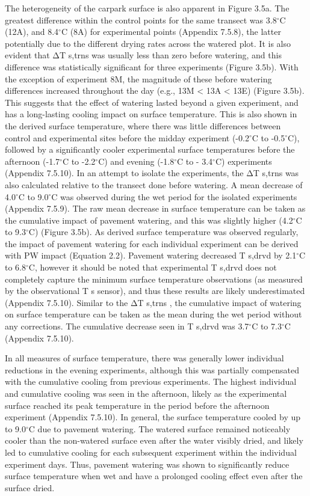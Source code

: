 \documentclass[final,3p,times,authoryear]{elsarticle}
\begin{document}
The heterogeneity of the carpark surface is also apparent in Figure 3.5a. The greatest
difference within the control points for the same transect was 3.8$^{\circ}$C (12A), and 8.4$^{\circ}$C
(8A) for experimental points (Appendix 7.5.8), the latter potentially due to the different
drying rates across the watered plot.
It is also evident that ΔT s,trns was usually less than zero before watering, and this
difference was statistically significant for three experiments (Figure 3.5b). With the
exception of experiment 8M, the magnitude of these before watering differences
increased throughout the day (e.g., 13M < 13A < 13E) (Figure 3.5b). This suggests that
the effect of watering lasted beyond a given experiment, and has a long-lasting cooling impact on surface temperature. This is also shown in the derived surface temperature,
where there was little differences between control and experimental sites before the
midday experiment (-0.2$^{\circ}$C to -0.5$^{\circ}$C), followed by a significantly cooler experimental
surface temperatures before the afternoon (-1.7$^{\circ}$C to -2.2$^{\circ}$C) and evening (-1.8$^{\circ}$C to -
3.4$^{\circ}$C) experiments (Appendix 7.5.10).
In an attempt to isolate the experiments, the ΔT s,trns was also calculated relative to the
transect done before watering. A mean decrease of 4.0$^{\circ}$C to 9.0$^{\circ}$C was observed
during the wet period for the isolated experiments (Appendix 7.5.9). The raw mean
decrease in surface temperature can be taken as the cumulative impact of pavement
watering, and this was slightly higher (4.2$^{\circ}$C to 9.3$^{\circ}$C) (Figure 3.5b).
As derived surface temperature was observed regularly, the impact of pavement
watering for each individual experiment can be derived with PW impact (Equation 2.2).
Pavement watering decreased T s,drvd by 2.1$^{\circ}$C to 6.8$^{\circ}$C, however it should be noted that
experimental T s,drvd does not completely capture the minimum surface temperature
observations (as measured by the observational T s sensor), and thus these results are
likely underestimated (Appendix 7.5.10). Similar to the ΔT s,trns , the cumulative impact
of watering on surface temperature can be taken as the mean during the wet period
without any corrections. The cumulative decrease seen in T s,drvd was 3.7$^{\circ}$C to 7.3$^{\circ}$C
(Appendix 7.5.10).

In all measures of surface temperature, there was generally lower individual reductions
in the evening experiments, although this was partially compensated with the
cumulative cooling from previous experiments. The highest individual and cumulative
cooling was seen in the afternoon, likely as the experimental surface reached its peak
temperature in the period before the afternoon experiment (Appendix 7.5.10).
In general, the surface temperature cooled by up to 9.0$^{\circ}$C due to pavement watering.
The watered surface remained noticeably cooler than the non-watered surface even after
the water visibly dried, and likely led to cumulative cooling for each subsequent
experiment within the individual experiment days. Thus, pavement watering was shown
to significantly reduce surface temperature when wet and have a prolonged cooling
effect even after the surface dried.
\end{document}
